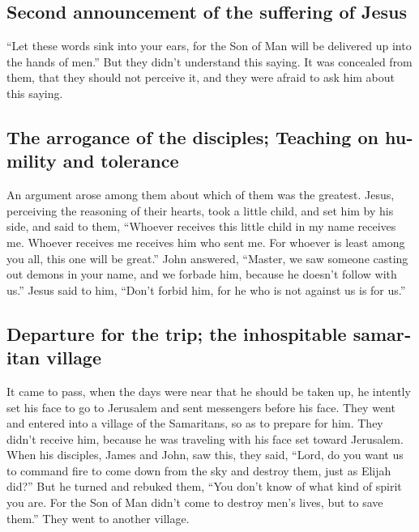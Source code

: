 \begin{paracol}{2}
\begin{otherlanguage}{english}
\hypertarget{second-announcement-of-the-suffering-of-jesus}{%
\subsection{Second announcement of the suffering of
Jesus}\label{second-announcement-of-the-suffering-of-jesus}}

 ``Let these words sink into your ears, for the Son of
Man will be delivered up into the hands of men.''  But
they didn't understand this saying. It was concealed from them, that
they should not perceive it, and they were afraid to ask him about this
saying.

\hypertarget{the-arrogance-of-the-disciples-teaching-on-humility-and-tolerance}{%
\subsection{The arrogance of the disciples; Teaching on humility and
tolerance}\label{the-arrogance-of-the-disciples-teaching-on-humility-and-tolerance}}

 An argument arose among them about which of them was the
greatest.  Jesus, perceiving the reasoning of their
hearts, took a little child, and set him by his side, 
and said to them, ``Whoever receives this little child in my name
receives me. Whoever receives me receives him who sent me. For whoever
is least among you all, this one will be great.''  John
answered, ``Master, we saw someone casting out demons in your name, and
we forbade him, because he doesn't follow with us.'' 
Jesus said to him, ``Don't forbid him, for he who is not against us is
for us.''

\hypertarget{departure-for-the-trip-the-inhospitable-samaritan-village}{%
\subsection{Departure for the trip; the inhospitable samaritan
village}\label{departure-for-the-trip-the-inhospitable-samaritan-village}}

 It came to pass, when the days were near that he should
be taken up, he intently set his face to go to Jerusalem 
and sent messengers before his face. They went and entered into a
village of the Samaritans, so as to prepare for him. 
They didn't receive him, because he was traveling with his face set
toward Jerusalem.  When his disciples, James and John,
saw this, they said, ``Lord, do you want us to command fire to come down
from the sky and destroy them, just as Elijah did?''  But
he turned and rebuked them, ``You don't know of what kind of spirit you
are.  For the Son of Man didn't come to destroy men's
lives, but to save them.'' They went to another village.


\end{otherlanguage}
\end{paracol}
